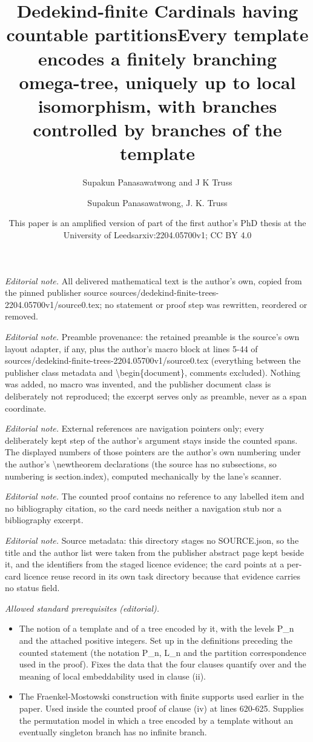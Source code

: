 \documentclass[10pt,a4paper]{amsart}
\title{Dedekind-finite Cardinals having countable partitions}
\author{Supakun Panasawatwong and J K Truss}
\date{This paper is an amplified version of part of the first author's PhD thesis at the University of Leeds}%
\title{Every template encodes a finitely branching omega-tree, uniquely up to local isomorphism, with branches controlled by branches of the template}
\author{Supakun Panasawatwong, J. K. Truss}
\date{arxiv:2204.05700v1; CC BY 4.0}
\begin{document}
\maketitle
\noindent\textit{Editorial note.} All delivered mathematical text is the author's own, copied from the pinned publisher source sources/dedekind-finite-trees-2204.05700v1/source0.tex; no statement or proof step was rewritten, reordered or removed.\par\medskip
\noindent\textit{Editorial note.} Preamble provenance: the retained preamble is the source's own layout adapter, if any, plus the author's macro block at lines 5-44 of sources/dedekind-finite-trees-2204.05700v1/source0.tex (everything between the publisher class metadata and \textbackslash{}begin\{document\}, comments excluded). Nothing was added, no macro was invented, and the publisher document class is deliberately not reproduced; the excerpt serves only as preamble, never as a span coordinate.\par\medskip
\noindent\textit{Editorial note.} External references are navigation pointers only; every deliberately kept step of the author's argument stays inside the counted spans. The displayed numbers of those pointers are the author's own numbering under the author's \textbackslash{}newtheorem declarations (the source has no subsections, so numbering is section.index), computed mechanically by the lane's scanner.\par\medskip
\noindent\textit{Editorial note.} The counted proof contains no reference to any labelled item and no bibliography citation, so the card needs neither a navigation stub nor a bibliography excerpt.\par\medskip
\noindent\textit{Editorial note.} Source metadata: this directory stages no SOURCE.json, so the title and the author list were taken from the publisher abstract page kept beside it, and the identifiers from the staged licence evidence; the card points at a per-card licence reuse record in its own task directory because that evidence carries no status field.\par\medskip
\noindent\textit{Allowed standard prerequisites (editorial).}\begin{itemize}
\item The notion of a template and of a tree encoded by it, with the levels P\_n and the attached positive integers. Set up in the definitions preceding the counted statement (the notation P\_n, L\_n and the partition correspondence used in the proof). Fixes the data that the four clauses quantify over and the meaning of local embeddability used in clause (ii).
\item The Fraenkel-Mostowski construction with finite supports used earlier in the paper. Used inside the counted proof of clause (iv) at lines 620-625. Supplies the permutation model in which a tree encoded by a template without an eventually singleton branch has no infinite branch.
\end{itemize}\medskip
\end{document}
